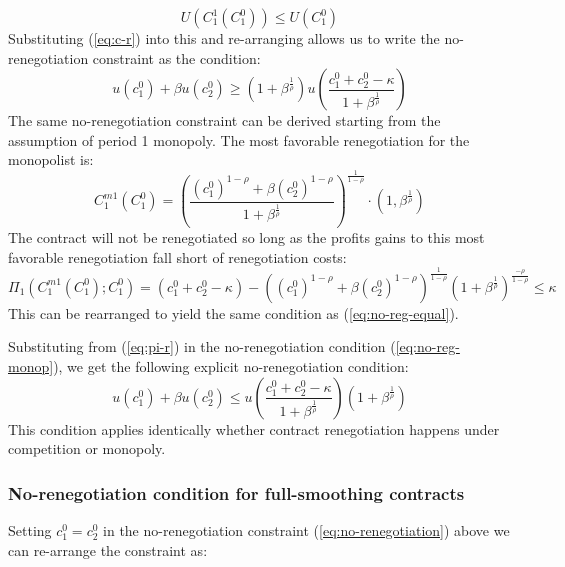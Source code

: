 \documentclass[11pt,english]{article}
\theoremstyle{plain}
\theoremstyle{definition}
\begin{document}
\begin{equation}
U(C_{1}^{1}\left(C_{1}^{0}\right))\le U(C_{1}^{0})\label{eq:uc-r}
\end{equation}
Substituting (\ref{eq:c-r}) into this and re-arranging allows us to
write the no-renegotiation constraint as the condition:
\begin{equation}
u(c_{1}^{0})+\beta u(c_{2}^{0})\ge(1+\beta^{\frac{1}{\rho}})u\left(\frac{c_{1}^{0}+c_{2}^{0}-\kappa}{1+\beta^{\frac{1}{\rho}}}\right)\label{eq:no-reg-equal}
\end{equation}
The same no-renegotiation constraint can be derived starting from
the assumption of period 1 monopoly. The most favorable renegotiation
for the monopolist is:
\begin{equation}
C_{1}^{m1}\left(C_{1}^{0}\right)=\left(\frac{(c_{1}^{0})^{1-\rho}+\beta(c_{2}^{0})^{1-\rho}}{1+\beta^{\frac{1}{\rho}}}\right)^{\frac{1}{1-\rho}}\cdot\left(1,\beta^{\frac{1}{\rho}}\right)\label{eq:m-r}
\end{equation}
The contract will not be renegotiated so long as the profits gains
to this most favorable renegotiation fall short of renegotiation costs:
\begin{equation}
\Pi_{1}\left(C_{1}^{m1}\left(C_{1}^{0}\right);C_{1}^{0}\right)=\left(c_{1}^{0}+c_{2}^{0}-\kappa\right)-\left((c_{1}^{0})^{1-\rho}+\beta(c_{2}^{0})^{1-\rho}\right)^{\frac{1}{1-\rho}}\left(1+\beta^{\frac{1}{\rho}}\right)^{\frac{-\rho}{1-\rho}}\le\kappa\label{eq:pi-r}
\end{equation}
This can be rearranged to yield the same condition as (\ref{eq:no-reg-equal}).



Substituting from (\ref{eq:pi-r}) in the no-renegotiation condition
(\ref{eq:no-reg-monop}), we get the following explicit no-renegotiation
condition: 
\begin{equation}
u(c_{1}^{0})+\beta u(c_{2}^{0})\le u\left(\frac{c_{1}^{0}+c_{2}^{0}-\kappa}{1+\beta^{\frac{1}{\rho}}}\right)(1+\beta^{\frac{1}{\rho}})\label{eq:no-renegotiation}
\end{equation}
This condition applies identically whether contract renegotiation
happens under competition or monopoly.

\subsubsection{No-renegotiation condition for full-smoothing contracts}

Setting $c_{1}^{0}=c_{2}^{0}$ in the no-renegotiation constraint
(\ref{eq:no-renegotiation}) above we can re-arrange the constraint
as: 
\end{document}
